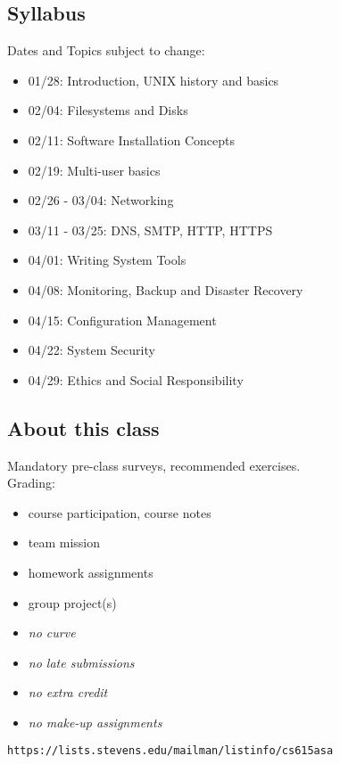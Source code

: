 \documentclass[xga]{xdvislides}
\begin{document}
\subsection{Syllabus}
Dates and Topics subject to change:
\begin{itemize}
	\item 01/28: Introduction, UNIX history and basics
	\item 02/04: Filesystems and Disks
	\item 02/11: Software Installation Concepts
	\item 02/19: Multi-user basics
	\item 02/26 - 03/04: Networking
	\item 03/11 - 03/25: DNS, SMTP, HTTP, HTTPS
	\item 04/01: Writing System Tools
	\item 04/08: Monitoring, Backup and Disaster Recovery
	\item 04/15: Configuration Management
	\item 04/22: System Security
	\item 04/29: Ethics and Social Responsibility
\end{itemize}

\subsection{About this class}
Mandatory pre-class surveys, recommended exercises. \\

Grading:
\begin{itemize}
	\item course participation, course notes
	\item team mission
	\item homework assignments
	\item group project(s)
	\item {\em no curve}
	\item {\em no late submissions}
	\item {\em no extra credit}
	\item {\em no make-up assignments}
\end{itemize}

\verb+https://lists.stevens.edu/mailman/listinfo/cs615asa+
\end{document}
